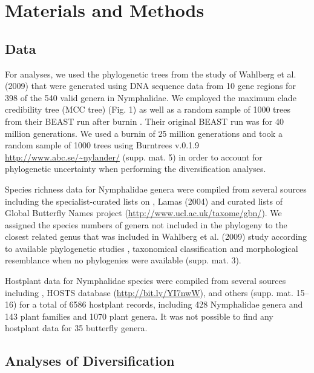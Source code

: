 \documentclass[10pt]{article}
\begin{document}
\section*{Materials and Methods}

\subsection*{Data}

For analyses, we used the phylogenetic trees from the study of Wahlberg
et al. (2009) \cite{wahlberg2009} that were generated using DNA sequence data from
10 gene regions for 398 of the 540 valid genera in Nymphalidae. We
employed the maximum clade credibility tree (MCC tree) (Fig. 1) as well
as a random sample of 1000 trees from their BEAST run after burnin
\cite{wahlberg2009}. Their original BEAST run was for 40 million generations. We
used a burnin of 25 million generations and took a random sample of 1000
trees using Burntrees v.0.1.9 \url{http://www.abc.se/~nylander/} (supp.
mat. 5) in order to account for phylogenetic uncertainty when performing
the diversification analyses.

Species richness data for Nymphalidae genera were compiled from several
sources including the specialist-curated lists on
\cite{tolweb2007}, Lamas (2004) \cite{lamas2004} and curated lists of
Global Butterfly Names project (\url{http://www.ucl.ac.uk/taxome/gbn/}).
We assigned the species numbers of genera not included in the phylogeny
to the closest related genus that was included in Wahlberg et al. (2009)
\cite{wahlberg2009} study according to available phylogenetic studies 
\cite{matos2013, brower2010, kodandaramaiah2010, kodandaramaiah2010a,
ortiz2013, desilva2010, freitas2004, pena2006, penz1999, silva2008,
pena2011, pena2010},
taxonomical classification and morphological resemblance when no
phylogenies were available (supp. mat. 3).

Hostplant data for Nymphalidae species were compiled from several
sources including \cite{ackery1988}, HOSTS database (\url{http://bit.ly/YI7nwW}),
\cite{dyer2002, beccaloni2008, janzen2009} and others (supp. mat. 15--16) for a total of 6586
hostplant records, including 428 Nymphalidae genera and 143 plant
families and 1070 plant genera. It was not possible to find any
hostplant data for 35 butterfly genera.

\subsection*{Analyses of Diversification}
\end{document}
